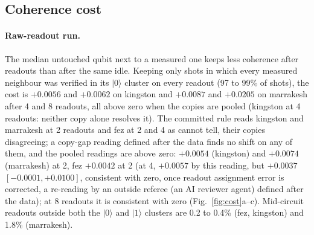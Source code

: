 \documentclass[reprint,amsmath,amssymb,aps,superscriptaddress,nofootinbib]{revtex4-2}
\begin{document}
\subsection{Coherence cost}\label{sec:supcost}

\paragraph*{Raw-readout run.} The median untouched qubit next to a measured one keeps less coherence after readouts than after the same idle. Keeping only shots in which every measured neighbour was verified in its $|0\rangle$ cluster on every readout (97 to 99\% of shots), the cost is $+0.0056$ and $+0.0062$ on kingston and $+0.0087$ and $+0.0205$ on marrakesh after 4 and 8 readouts, all above zero when the copies are pooled (kingston at 4 readouts: neither copy alone resolves it). The committed rule reads kingston and marrakesh at 2 readouts and fez at 2 and 4 as cannot tell, their copies disagreeing; a copy-gap reading defined after the data finds no shift on any of them, and the pooled readings are above zero: $+0.0054$ (kingston) and $+0.0074$ (marrakesh) at 2, fez $+0.0042$ at 2 (at 4, $+0.0057$ by this reading, but $+0.0037$ $[-0.0001, +0.0100]$, consistent with zero, once readout assignment error is corrected, a re-reading by an outside referee (an AI reviewer agent) defined after the data); at 8 readouts it is consistent with zero (Fig.~\ref{fig:cost}a--c). Mid-circuit readouts outside both the $|0\rangle$ and $|1\rangle$ clusters are 0.2 to 0.4\% (fez, kingston) and 1.8\% (marrakesh).
\end{document}
